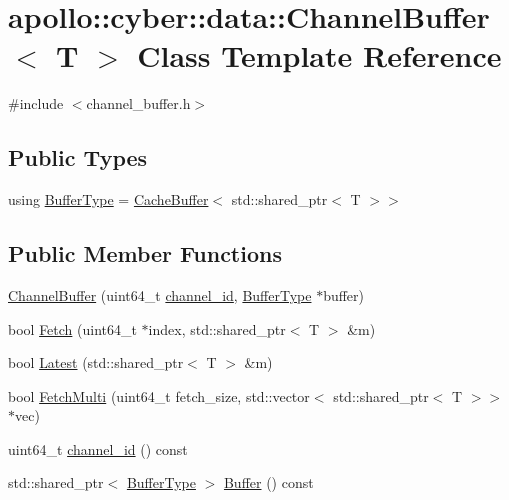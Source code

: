 \hypertarget{classapollo_1_1cyber_1_1data_1_1ChannelBuffer}{\section{apollo\-:\-:cyber\-:\-:data\-:\-:Channel\-Buffer$<$ T $>$ Class Template Reference}
\label{classapollo_1_1cyber_1_1data_1_1ChannelBuffer}
}


{\ttfamily \#include $<$channel\-\_\-buffer.\-h$>$}

\subsection*{Public Types}
\begin{DoxyCompactItemize}
\item 
using \hyperlink{classapollo_1_1cyber_1_1data_1_1ChannelBuffer_a4d0e8b23e4b308b61ca0154970cec77f}{Buffer\-Type} = \hyperlink{classapollo_1_1cyber_1_1data_1_1CacheBuffer}{Cache\-Buffer}$<$ std\-::shared\-\_\-ptr$<$ T $>$$>$
\end{DoxyCompactItemize}
\subsection*{Public Member Functions}
\begin{DoxyCompactItemize}
\item 
\hyperlink{classapollo_1_1cyber_1_1data_1_1ChannelBuffer_af90aee7c0f697fc64c495829816d28fd}{Channel\-Buffer} (uint64\-\_\-t \hyperlink{classapollo_1_1cyber_1_1data_1_1ChannelBuffer_abb1ae153da4014b45a4c5591e3209a53}{channel\-\_\-id}, \hyperlink{classapollo_1_1cyber_1_1data_1_1ChannelBuffer_a4d0e8b23e4b308b61ca0154970cec77f}{Buffer\-Type} $\ast$buffer)
\item 
bool \hyperlink{classapollo_1_1cyber_1_1data_1_1ChannelBuffer_a8f82b68889d1cc8f68760103fcfdb4ed}{Fetch} (uint64\-\_\-t $\ast$index, std\-::shared\-\_\-ptr$<$ T $>$ \&m)
\item 
bool \hyperlink{classapollo_1_1cyber_1_1data_1_1ChannelBuffer_a29071a969030a646c7d7becd894e8767}{Latest} (std\-::shared\-\_\-ptr$<$ T $>$ \&m)
\item 
bool \hyperlink{classapollo_1_1cyber_1_1data_1_1ChannelBuffer_a6e58caceefc98711d66d4bbeb07b51d8}{Fetch\-Multi} (uint64\-\_\-t fetch\-\_\-size, std\-::vector$<$ std\-::shared\-\_\-ptr$<$ T $>$$>$ $\ast$vec)
\item 
uint64\-\_\-t \hyperlink{classapollo_1_1cyber_1_1data_1_1ChannelBuffer_abb1ae153da4014b45a4c5591e3209a53}{channel\-\_\-id} () const 
\item 
std\-::shared\-\_\-ptr$<$ \hyperlink{classapollo_1_1cyber_1_1data_1_1ChannelBuffer_a4d0e8b23e4b308b61ca0154970cec77f}{Buffer\-Type} $>$ \hyperlink{classapollo_1_1cyber_1_1data_1_1ChannelBuffer_abb9e4babe4169c9b3cd3125f84a7da1f}{Buffer} () const 
\end{DoxyCompactItemize}
